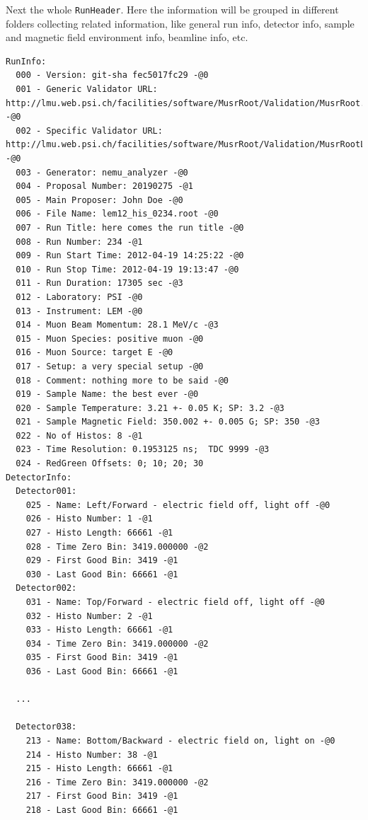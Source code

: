 \documentclass[twoside]{article}
\begin{document}
Next the whole \texttt{RunHeader}. Here the information will be grouped in different folders collecting related information, like general run info, detector info, sample and magnetic field environment info, beamline info, etc.
\begin{small}
\begin{verbatim}
RunInfo:
  000 - Version: git-sha fec5017fc29 -@0
  001 - Generic Validator URL: http://lmu.web.psi.ch/facilities/software/MusrRoot/Validation/MusrRoot.xsd -@0
  002 - Specific Validator URL: http://lmu.web.psi.ch/facilities/software/MusrRoot/Validation/MusrRootLEM.xsd -@0
  003 - Generator: nemu_analyzer -@0
  004 - Proposal Number: 20190275 -@1
  005 - Main Proposer: John Doe -@0
  006 - File Name: lem12_his_0234.root -@0
  007 - Run Title: here comes the run title -@0
  008 - Run Number: 234 -@1
  009 - Run Start Time: 2012-04-19 14:25:22 -@0
  010 - Run Stop Time: 2012-04-19 19:13:47 -@0
  011 - Run Duration: 17305 sec -@3
  012 - Laboratory: PSI -@0
  013 - Instrument: LEM -@0
  014 - Muon Beam Momentum: 28.1 MeV/c -@3
  015 - Muon Species: positive muon -@0
  016 - Muon Source: target E -@0
  017 - Setup: a very special setup -@0
  018 - Comment: nothing more to be said -@0
  019 - Sample Name: the best ever -@0
  020 - Sample Temperature: 3.21 +- 0.05 K; SP: 3.2 -@3
  021 - Sample Magnetic Field: 350.002 +- 0.005 G; SP: 350 -@3
  022 - No of Histos: 8 -@1
  023 - Time Resolution: 0.1953125 ns;  TDC 9999 -@3
  024 - RedGreen Offsets: 0; 10; 20; 30
DetectorInfo:
  Detector001:
    025 - Name: Left/Forward - electric field off, light off -@0
    026 - Histo Number: 1 -@1
    027 - Histo Length: 66661 -@1
    028 - Time Zero Bin: 3419.000000 -@2
    029 - First Good Bin: 3419 -@1
    030 - Last Good Bin: 66661 -@1
  Detector002:
    031 - Name: Top/Forward - electric field off, light off -@0
    032 - Histo Number: 2 -@1
    033 - Histo Length: 66661 -@1
    034 - Time Zero Bin: 3419.000000 -@2
    035 - First Good Bin: 3419 -@1
    036 - Last Good Bin: 66661 -@1

  ...

  Detector038:
    213 - Name: Bottom/Backward - electric field on, light on -@0
    214 - Histo Number: 38 -@1
    215 - Histo Length: 66661 -@1
    216 - Time Zero Bin: 3419.000000 -@2
    217 - First Good Bin: 3419 -@1
    218 - Last Good Bin: 66661 -@1


\end{verbatim}
\end{small}
\end{document}
